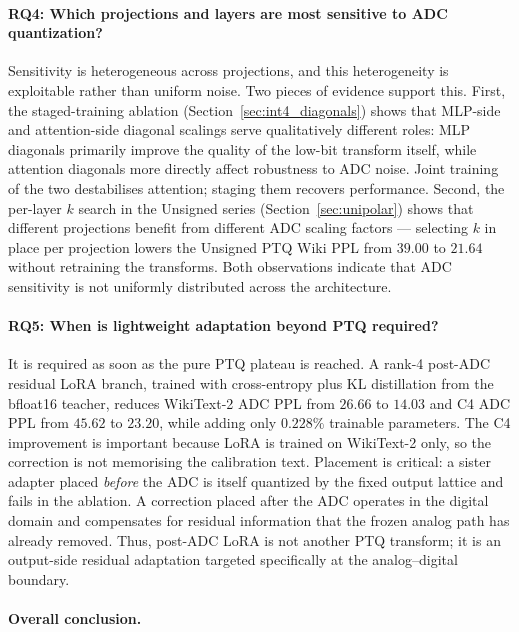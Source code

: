\documentclass[a4paper,11pt,oneside]{article}
\theoremstyle{breakstyle}
\begin{document}
  \paragraph{RQ4: Which projections and layers are most sensitive to ADC quantization?}

  Sensitivity is heterogeneous across projections, and this
  heterogeneity is exploitable rather than uniform noise.  Two
  pieces of evidence support this.  First, the staged-training
  ablation (Section~\ref{sec:int4_diagonals}) shows that MLP-side and
  attention-side diagonal scalings serve qualitatively different
  roles: MLP diagonals primarily improve the quality of the low-bit
  transform itself, while attention diagonals more directly affect
  robustness to ADC noise.  Joint training of the two destabilises
  attention; staging them recovers performance.  Second, the per-layer
  $k$ search in the Unsigned series (Section~\ref{sec:unipolar})
  shows that different projections benefit from different ADC scaling
  factors --- selecting $k$ in place per projection lowers the
  Unsigned PTQ Wiki PPL from $39.00$ to $21.64$ without retraining
  the transforms.  Both observations indicate that ADC sensitivity is
  not uniformly distributed across the architecture.

  \paragraph{RQ5: When is lightweight adaptation beyond PTQ required?}

  It is required as soon as the pure PTQ plateau is reached.  A
  rank-4 post-ADC residual LoRA branch, trained with cross-entropy
  plus KL distillation from the bfloat16 teacher, reduces WikiText-2
  ADC PPL from $26.66$ to $14.03$ and C4 ADC PPL from $45.62$ to
  $23.20$, while adding only $0.228\%$ trainable parameters.  The C4
  improvement is important because LoRA is trained on WikiText-2
  only, so the correction is not memorising the calibration text.
  Placement is critical: a sister adapter placed \emph{before} the
  ADC is itself quantized by the fixed output lattice and fails in
  the ablation.  A correction placed after the ADC operates in the
  digital domain and compensates for residual information that the
  frozen analog path has already removed.  Thus, post-ADC LoRA is not
  another PTQ transform; it is an output-side residual adaptation
  targeted specifically at the analog--digital boundary.

  \paragraph{Overall conclusion.}
\end{document}
